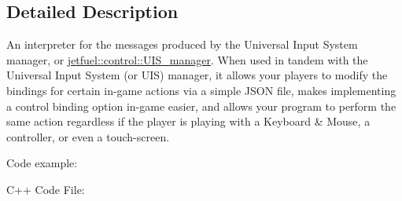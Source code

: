 \subsection{Detailed Description}
An interpreter for the messages produced by the Universal Input System manager, or \hyperlink{classjetfuel_1_1control_1_1UIS__manager}{jetfuel\+::control\+::\+U\+I\+S\+\_\+manager}. When used in tandem with the Universal Input System (or U\+IS) manager, it allows your players to modify the bindings for certain in-\/game actions via a simple J\+S\+ON file, makes implementing a control binding option in-\/game easier, and allows your program to perform the same action regardless if the player is playing with a Keyboard \& Mouse, a controller, or even a touch-\/screen.

Code example\+: \begin{DoxyVerb}C++ Code File:
\end{DoxyVerb}
 
